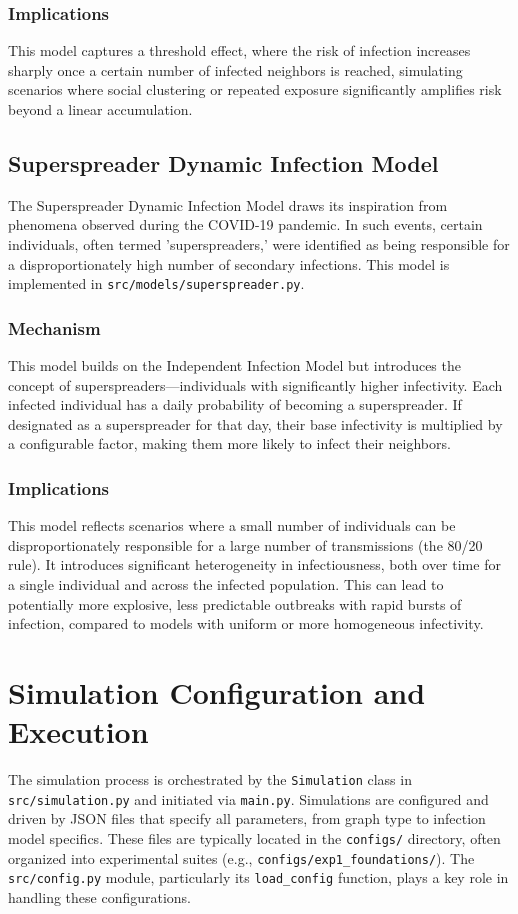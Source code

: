 \documentclass[12pt]{article}
\begin{document}
\subsubsection{Implications}
This model captures a threshold effect, where the risk of infection increases sharply once a certain number of infected neighbors is reached, simulating scenarios where social clustering or repeated exposure significantly amplifies risk beyond a linear accumulation.

\subsection{Superspreader Dynamic Infection Model}
The Superspreader Dynamic Infection Model draws its inspiration from phenomena observed during the COVID-19 pan\-dem\-ic. In such events, certain in\-di\-vid\-u\-als, often termed 'su\-per\-spread\-ers,' were identified as being responsible for a dis\-pro\-por\-tion\-ate\-ly high number of secondary infections. This model is implemented in \texttt{src/models/super\-spreader.py}.
\subsubsection{Mechanism}
This model builds on the Independent Infection Model but introduces the concept of superspreaders—individuals with significantly higher infectivity. Each infected individual has a daily probability of becoming a superspreader. If designated as a superspreader for that day, their base infectivity is multiplied by a configurable factor, making them more likely to infect their neighbors.
\subsubsection{Implications}
This model reflects scenarios where a small number of individuals can be disproportionately responsible for a large number of transmissions (the 80/20 rule). It introduces significant heterogeneity in infectiousness, both over time for a single individual and across the infected population. This can lead to potentially more explosive, less predictable outbreaks with rapid bursts of infection, compared to models with uniform or more homogeneous infectivity.

\section{Simulation Configuration and Execution}
The simulation process is orchestrated by the \texttt{Simulation} class in \texttt{src/simulation.py} and initiated via \texttt{main.py}. Simulations are configured and driven by JSON files that specify all parameters, from graph type to infection model specifics. These files are typically located in the \texttt{configs/} directory, often organized into experimental suites (e.g., \texttt{configs/exp1\_{}foun\-da\-tions/}). The \texttt{src/config.py} module, particularly its \texttt{load\_config} function, plays a key role in handling these configurations.
\end{document}
